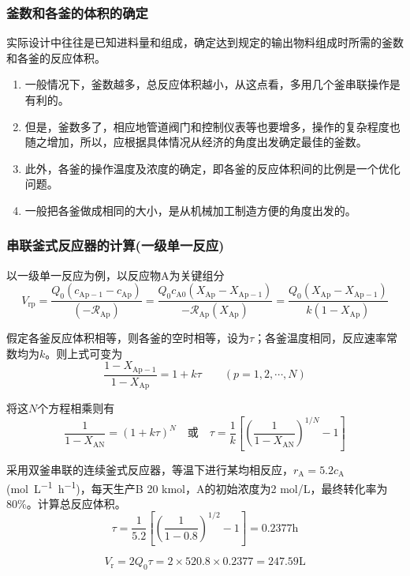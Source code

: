 \documentclass[dvipsnames, svgnames, x11names]{beamer}
\begin{document}
\begin{frame}
    \frametitle{釜数和各釜的体积的确定}

    \large 实际设计中往往是已知进料量和组成，确定达到规定的输出物料组成时所需的釜数和各釜的反应体积。

    \begin{enumerate}
      \item 一般情况下，釜数越多，总反应体积越小，从这点看，多用几个釜串联操作是有利的。
      \item 但是，釜数多了，相应地管道阀门和控制仪表等也要增多，操作的复杂程度也随之增加，所以，应根据具体情况从经济的角度出发确定最佳的釜数。
      \item 此外，各釜的操作温度及浓度的确定，即各釜的反应体积间的比例是一个优化问题。
      \item 一般把各釜做成相同的大小，是从机械加工制造方便的角度出发的。
    \end{enumerate}
\end{frame}


\begin{frame}
    \frametitle{串联釜式反应器的计算(一级单一反应)}

    以一级单一反应为例，以反应物A为关键组分
    \[
        V_{\mathrm{rp}}=\frac{Q_{0}(c_{\mathrm{Ap}-1}-c_{\mathrm{Ap}})}{(-\mathscr{R}_{\mathrm{Ap}})} =\frac{Q_{0} c_{\mathrm{A} 0}(X_{\mathrm{Ap}}-X_{\mathrm{Ap}-1})}{-\mathscr{R}_{\mathrm{Ap}}(X_{\mathrm{Ap}})} =\frac{Q_{0}(X_{\mathrm{Ap}}-X_{\mathrm{Ap}-1})}{k(1-X_{\mathrm{Ap}})}
    \]

    假定各釜反应体积相等，则各釜的空时相等，设为$\tau$；各釜温度相同，反应速率常数均为$k$。则上式可变为
    \[
        \frac{1-X_{\mathrm{Ap}-1}}{1-X_{\mathrm{Ap}}}=1+k \tau \qquad (p=1,2,\cdots , N)
    \]

    将这$N$个方程相乘则有
    \[
        \frac{1}{1-X_{\mathrm{AN}}}=(1+k \tau)^{N} \quad \text{或} \quad \tau=\frac{1}{k}\left[\left(\frac{1}{1-X_{\mathrm{AN}}}\right)^{1 / N}-1\right]
    \]

\end{frame}


\begin{frame}[t]{}
    \begin{example}
        采用双釜串联的连续釜式反应器，等温下进行某均相反应，$r_\mathrm{A}=5.2c_\mathrm{A}$ (\si{mol.L^{-1}.h^{-1}})，每天生产B 20 kmol，A的初始浓度为2 mol/L，最终转化率为80\%。计算总反应体积。
    \tcblower
    \pause
    \[
        \tau=\frac{1}{5.2}\left[\left(\frac{1}{1-0.8}\right)^{1 / 2}-1\right]=0.2377 \mathrm{h}
    \]

    \[
        V_\mathrm{r}=2Q_0 \tau = 2 \times 520.8 \times 0.2377 = 247.59 \mathrm{L}
    \]
    \end{example}
\end{frame}
\end{document}
